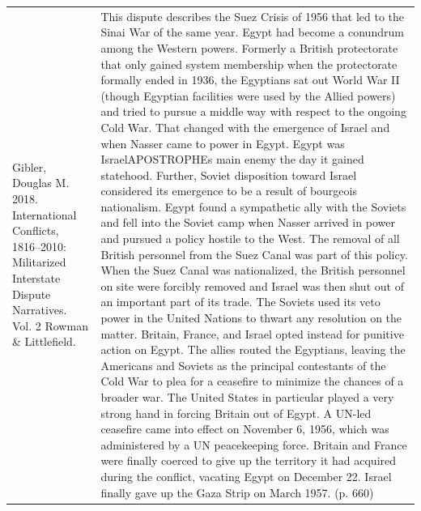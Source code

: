 {\begin{longtable}{p{}p{}}
Gibler, Douglas M. 2018. International Conflicts, 1816–2010: Militarized Interstate Dispute Narratives. Vol. 2 Rowman \& Littlefield. & This dispute describes the Suez Crisis of 1956 that led to the Sinai War of the same year. Egypt had become a conundrum among the Western powers. Formerly a British protectorate that only gained system membership when the protectorate formally ended in 1936, the Egyptians sat out World War II (though Egyptian facilities were used by the Allied powers) and tried to pursue a middle way with respect to the ongoing Cold War. That changed with the emergence of Israel and when Nasser came to power in Egypt. Egypt was IsraelAPOSTROPHEs main enemy the day it gained statehood. Further, Soviet disposition toward Israel considered its emergence to be a result of bourgeois nationalism. Egypt found a sympathetic ally with the Soviets and fell into the Soviet camp when Nasser arrived in power and pursued a policy hostile to the West. The removal of all British personnel from the Suez Canal was part of this policy. When the Suez Canal was nationalized, the British personnel on site were forcibly removed and Israel was then shut out of an important part of its trade. The Soviets used its veto power in the United Nations to thwart any resolution on the matter. Britain, France, and Israel opted instead for punitive action on Egypt. The allies routed the Egyptians, leaving the Americans and Soviets as the principal contestants of the Cold War to plea for a ceasefire to minimize the chances of a broader war. The United States in particular played a very strong hand in forcing Britain out of Egypt. A UN-led ceasefire came into effect on November 6, 1956, which was administered by a UN peacekeeping force. Britain and France were finally coerced to give up the territory it had acquired during the conflict, vacating Egypt on December 22. Israel finally gave up the Gaza Strip on March 1957. (p. 660)
\\

\end{longtable}}
